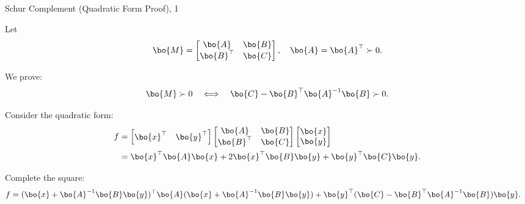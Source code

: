 \documentclass{beamer}
\begin{document}
\myqrframe




\begin{frame}{Schur Complement (Quadratic Form Proof), 1}
	\begin{flushleft}
		
		Let 
		\[
		\bo{M} = 
		\begin{bmatrix}
			\bo{A} & \bo{B} \\
			\bo{B}^\top & \bo{C}
		\end{bmatrix},
		\quad \bo{A} = \bo{A}^\top \succ 0.
		\]
		
		We prove:
		\[
		\bo{M} \succ 0 
		\quad \Longleftrightarrow \quad
		\bo{C} - \bo{B}^\top \bo{A}^{-1} \bo{B} \succ 0.
		\]
		
		\bigskip
		
		Consider the quadratic form:
		\begin{align}
			f &= 
			\begin{bmatrix}
				\bo{x}^\top & \bo{y}^\top
			\end{bmatrix}
			\begin{bmatrix}
				\bo{A} & \bo{B} \\
				\bo{B}^\top & \bo{C}
			\end{bmatrix}
			\begin{bmatrix}
				\bo{x} \\ \bo{y}
			\end{bmatrix} \\
			&= \bo{x}^\top \bo{A} \bo{x} + 2 \bo{x}^\top \bo{B} \bo{y} + \bo{y}^\top \bo{C} \bo{y}.
		\end{align}
		
		\bigskip
		
		Complete the square:
		\begin{align*}
			f &= 
			(\bo{x} + \bo{A}^{-1}\bo{B}\bo{y})^\top 
			\bo{A} 
			(\bo{x} + \bo{A}^{-1}\bo{B}\bo{y})
			+ \bo{y}^\top (\bo{C} - \bo{B}^\top \bo{A}^{-1}\bo{B}) \bo{y}.
		\end{align*}
		
	\end{flushleft}
\end{frame}
\end{document}
